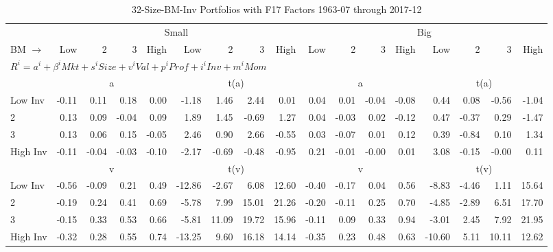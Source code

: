 
\begin{table}[!ht]
\footnotesize
\centering
\caption{32-Size-BM-Inv Portfolios with F17 Factors 1963-07 through 2017-12}
\begin{tabular}{lrrrrrrrrrrrrrrrr}
  \toprule
    & \multicolumn{8}{c}{Small} & \multicolumn{8}{c}{Big} \\
      \cmidrule(r){2-9} \cmidrule(r){10-17}
    BM $\rightarrow$ & Low & 2 & 3 & High & Low & 2 & 3 & High & Low & 2 & 3 & High & Low & 2 & 3 & High \\ 
  \midrule
  \multicolumn{17}{l}{$R^i=a^i+\beta^iMkt+s^iSize+v^iVal+p^iProf+i^iInv+m^iMom$} \\

  
    
      & \multicolumn{4}{c}{a} & \multicolumn{4}{c}{t(a)}
    
      & \multicolumn{4}{c}{a} & \multicolumn{4}{c}{t(a)}
    
    \\
      \cmidrule(r){2-5} \cmidrule(r){6-9} \cmidrule(r){10-13} \cmidrule(r){14-17}

    Low Inv   & -0.11  & 0.11  & 0.18  & 0.00  & -1.18  & 1.46  & 2.44  & 0.01  & 0.04  & 0.01  & -0.04  & -0.08  & 0.44  & 0.08  & -0.56  & -1.04  \\
           2  & 0.13  & 0.09  & -0.04  & 0.09  & 1.89  & 1.45  & -0.69  & 1.27  & 0.04  & -0.03  & 0.02  & -0.12  & 0.47  & -0.37  & 0.29  & -1.47  \\
           3  & 0.13  & 0.06  & 0.15  & -0.05  & 2.46  & 0.90  & 2.66  & -0.55  & 0.03  & -0.07  & 0.01  & 0.12  & 0.39  & -0.84  & 0.10  & 1.34  \\
    High Inv  & -0.11  & -0.04  & -0.03  & -0.10  & -2.17  & -0.69  & -0.48  & -0.95  & 0.21  & -0.01  & -0.00  & 0.01  & 3.08  & -0.15  & -0.00  & 0.11  \\

  
    
      & \multicolumn{4}{c}{v} & \multicolumn{4}{c}{t(v)}
    
      & \multicolumn{4}{c}{v} & \multicolumn{4}{c}{t(v)}
    
    \\
      \cmidrule(r){2-5} \cmidrule(r){6-9} \cmidrule(r){10-13} \cmidrule(r){14-17}

    Low Inv   & -0.56  & -0.09  & 0.21  & 0.49  & -12.86  & -2.67  & 6.08  & 12.60  & -0.40  & -0.17  & 0.04  & 0.56  & -8.83  & -4.46  & 1.11  & 15.64  \\
           2  & -0.19  & 0.24  & 0.41  & 0.69  & -5.78  & 7.99  & 15.01  & 21.26  & -0.20  & -0.11  & 0.25  & 0.70  & -4.85  & -2.89  & 6.51  & 17.70  \\
           3  & -0.15  & 0.33  & 0.53  & 0.66  & -5.81  & 11.09  & 19.72  & 15.96  & -0.11  & 0.09  & 0.33  & 0.94  & -3.01  & 2.45  & 7.92  & 21.95  \\
    High Inv  & -0.32  & 0.28  & 0.55  & 0.74  & -13.25  & 9.60  & 16.18  & 14.14  & -0.35  & 0.23  & 0.48  & 0.63  & -10.60  & 5.11  & 10.11  & 12.62  \\


\end{tabular}
\end{table}

